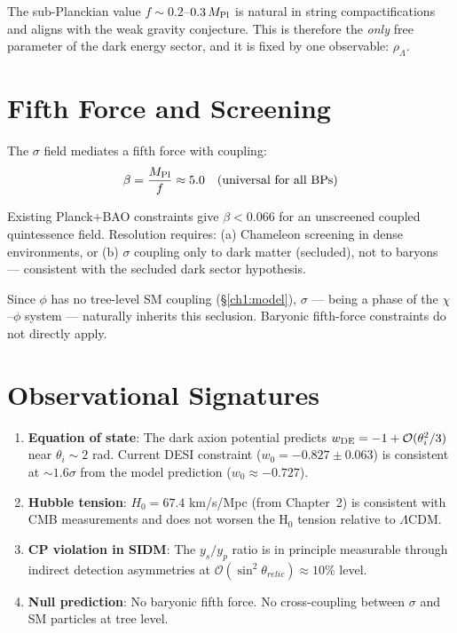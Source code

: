The sub-Planckian value $f \sim 0.2$--$0.3\,M_{\rm Pl}$ is natural in string
compactifications and aligns with the weak gravity conjecture.
This is therefore the \emph{only} free parameter of the dark energy sector,
and it is fixed by one observable: $\rho_\Lambda$.

\section{Fifth Force and Screening}
\label{ch3:fifthforce}

The $\sigma$ field mediates a fifth force with coupling:
\begin{equation}
  \beta = \frac{M_{\rm Pl}}{f} \approx 5.0 \quad \text{(universal for all BPs)}
\end{equation}

Existing Planck+BAO constraints give $\beta < 0.066$ for an unscreened
coupled quintessence field. Resolution requires:
(a) Chameleon screening in dense environments, or
(b) $\sigma$ coupling only to dark matter (secluded),
    not to baryons — consistent with the secluded dark sector hypothesis.

Since $\phi$ has no tree-level SM coupling (§\ref{ch1:model}), $\sigma$ — being
a phase of the $\chi$–$\phi$ system — naturally inherits this seclusion.
Baryonic fifth-force constraints do not directly apply.

\section{Observational Signatures}
\label{ch3:signatures}

\begin{enumerate}
  \item \textbf{Equation of state}: The dark axion potential predicts
        $w_{\rm DE} = -1 + \mathcal{O}(\theta_i^2/3)$ near $\theta_i \sim 2$ rad.
        Current DESI constraint ($w_0 = -0.827 \pm 0.063$) is consistent at
        $\sim 1.6\sigma$ from the model prediction ($w_0 \approx -0.727$).

  \item \textbf{Hubble tension}: $H_0 = 67.4$ km/s/Mpc (from Chapter~2)
        is consistent with CMB measurements and does not worsen the H$_0$ tension
        relative to $\Lambda$CDM.

  \item \textbf{CP violation in SIDM}: The $y_s/y_p$ ratio is in principle
        measurable through indirect detection asymmetries at
        $\mathcal{O}(\sin^2\theta_{relic}) \approx 10\%$ level.

  \item \textbf{Null prediction}: No baryonic fifth force.
        No cross-coupling between $\sigma$ and SM particles at tree level.
\end{enumerate}

